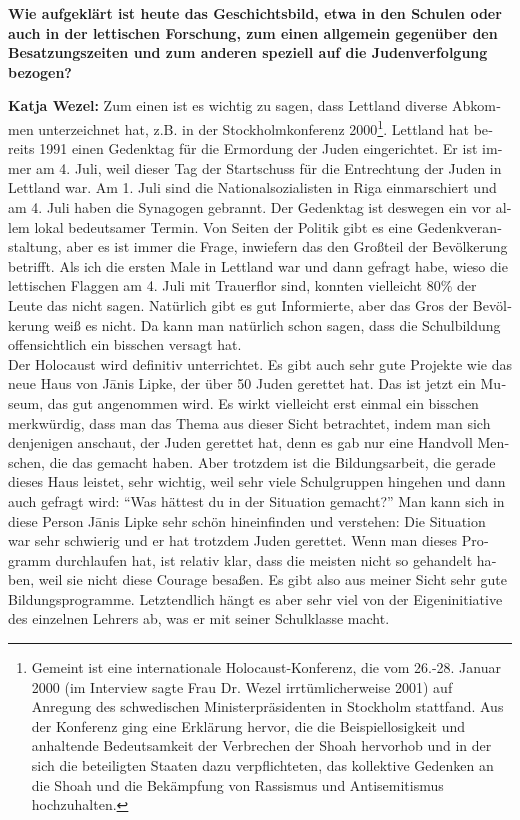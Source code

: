 \begin{otherlanguage}{ngerman}
\textbf{Wie aufgeklärt ist heute das Geschichtsbild, etwa in den Schulen oder auch in der lettischen Forschung, zum einen allgemein gegenüber den Besatzungszeiten und zum anderen speziell auf die Judenverfolgung bezogen?} 

\textbf{Katja Wezel:} Zum einen ist es wichtig zu sagen, dass Lettland diverse Abkommen unterzeichnet hat, z.B. in der Stockholmkonferenz 2000\footnote{Gemeint ist eine internationale Holocaust-Konferenz, die vom 26.-28. Januar 2000 (im Interview sagte Frau Dr. Wezel irrtümlicherweise 2001) auf Anregung des schwedischen Ministerpräsidenten in Stockholm stattfand. Aus der Konferenz ging eine Erklärung hervor, die die Beispiellosigkeit und anhaltende Bedeutsamkeit der Verbrechen der Shoah hervorhob und in der sich die beteiligten Staaten dazu verpflichteten, das kollektive Gedenken an die Shoah und die Bekämpfung von Rassismus und Antisemitismus hochzuhalten.}. Lettland hat bereits 1991 einen Gedenktag für die Ermordung der Juden eingerichtet. Er ist immer am 4. Juli, weil dieser Tag der Startschuss für die Entrechtung der Juden in Lettland war. Am 1. Juli sind die Nationalsozialisten in Riga einmarschiert und am 4. Juli haben die Synagogen gebrannt. Der Gedenktag ist deswegen ein vor allem lokal bedeutsamer Termin. Von Seiten der Politik gibt es eine Gedenkveranstaltung, aber es ist immer die Frage, inwiefern das den Großteil der Bevölkerung betrifft. Als ich die ersten Male in Lettland war und dann gefragt habe, wieso die lettischen Flaggen am 4. Juli mit Trauerflor sind, konnten vielleicht 80\% der Leute das nicht sagen. Natürlich gibt es gut Informierte, aber das Gros der Bevölkerung weiß es nicht. Da kann man natürlich schon sagen, dass die Schulbildung offensichtlich ein bisschen versagt hat.\\ 
Der Holocaust wird definitiv unterrichtet. Es gibt auch sehr gute Projekte wie das neue Haus von Jānis Lipke, der über 50 Juden gerettet hat. Das ist jetzt ein Museum, das gut angenommen wird. Es wirkt vielleicht erst einmal ein bisschen merkwürdig, dass man das Thema aus dieser Sicht betrachtet, indem man sich denjenigen anschaut, der Juden gerettet hat, denn es gab nur eine Handvoll Menschen, die das gemacht haben. Aber trotzdem ist die Bildungsarbeit, die gerade dieses Haus leistet, sehr wichtig, weil sehr viele Schulgruppen hingehen und dann auch gefragt wird: "`Was hättest du in der Situation gemacht?"' Man kann sich in diese Person Jānis Lipke sehr schön hineinfinden und verstehen: Die Situation war sehr schwierig und er hat trotzdem Juden gerettet. Wenn man dieses Programm durchlaufen hat, ist relativ klar, dass die meisten nicht so gehandelt haben, weil sie nicht diese Courage besaßen. Es gibt also aus meiner Sicht sehr gute Bildungsprogramme. Letztendlich hängt es aber sehr viel von der Eigeninitiative des einzelnen Lehrers ab, was er mit seiner Schulklasse macht. 

\end{otherlanguage}
